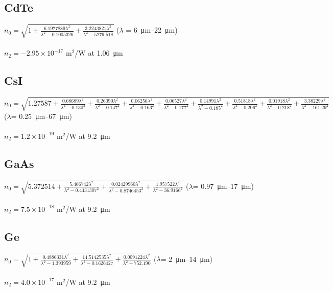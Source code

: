 \subsection*{CdTe}
$n_0=\sqrt{1+\frac{6.1977889\lambda^2}{\lambda^2-0.1005326}+\frac{3.2243821\lambda^2}{\lambda^2-5279.518}}$ (\(\lambda\) = \SIrange{6}{22}{\micro\meter}) \cite{DeBell-1979}\\
\\
$n_2 = -2.95\times 10^{-17}$ m$^2$/W at \SI{1.06}{\micro\meter} \cite{Sheik-Bahae-1991}

\subsection*{CsI}
$n_0=\sqrt{1.27587+\frac{0.68689\lambda^2}{\lambda^2-0.130^2}+\frac{0.26090\lambda^2}{\lambda^2-0.147^2}+\frac{0.06256\lambda^2}{\lambda^2-0.163^2}+\frac{0.06527\lambda^2}{\lambda^2-0.177^2}+\frac{0.14991\lambda^2}{\lambda^2-0.185^2}+\frac{0.51818\lambda^2}{\lambda^2-0.206^2}+\frac{0.01918\lambda^2}{\lambda^2-0.218^2}+\frac{3.38229\lambda^2}{\lambda^2-161.29^2}}$ (\(\lambda\)= \SIrange{0.25}{67}{\micro\meter}) \cite{Li-1976}\\
\\
$n_2 = 1.2\times 10^{-19}$ m$^2$/W at \SI{9.2}{\micro\meter} \cite{Polyanskiy-2024}

\subsection*{GaAs}
$n_0=\sqrt{5.372514+\frac{5.466742\lambda^2}{\lambda^2-0.4431307^2}+\frac{0.02429960\lambda^2}{\lambda^2-0.8746453^2}+\frac{1.957522\lambda^2}{\lambda^2-36.9166^2}}$ (\(\lambda\)= \SIrange{0.97}{17}{\micro\meter}) \cite{Skauli-2003}\\
\\
$n_2 = 7.5\times 10^{-18}$ m$^2$/W at \SI{9.2}{\micro\meter} \cite{Polyanskiy-2024}

\subsection*{Ge}
$n_0=\sqrt{1+\frac{0.4886331\lambda^2}{\lambda^2-1.393959}+\frac{14.5142535\lambda^2}{\lambda^2-0.1626427}+\frac{0.0091224\lambda^2}{\lambda^2-752.190}}$ (\(\lambda\)= \SIrange{2}{14}{\micro\meter}) \cite{Burnett-2016}\\
\\
$n_2 = 4.0\times 10^{-17}$ m$^2$/W at \SI{9.2}{\micro\meter} \cite{Polyanskiy-2024}

